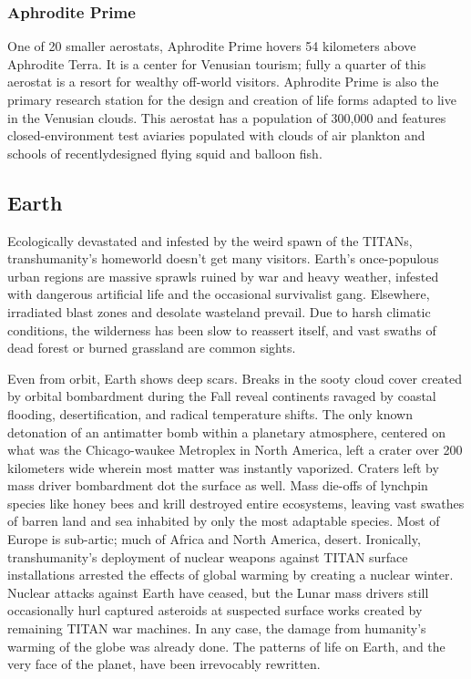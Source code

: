 \subsubsection{Aphrodite Prime}
\label{sec:aphrodite-prime}

One of 20 smaller aerostats, Aphrodite Prime hovers 54 kilometers
above Aphrodite Terra. It is a center for Venusian tourism; fully a
quarter of this aerostat is a resort for wealthy off-world
visitors. Aphrodite Prime is also the primary research station for the
design and creation of life forms adapted to live in the Venusian
clouds. This aerostat has a population of 300,000 and features
closed-environment test aviaries populated with clouds of air plankton
and schools of recentlydesigned flying squid and balloon fish.

\subsection{Earth}
\label{sec:earth}

Ecologically devastated and infested by the weird spawn of the TITANs,
transhumanity's homeworld doesn't get many visitors. Earth's
once-populous urban regions are massive sprawls ruined by war and
heavy weather, infested with dangerous artificial life and the
occasional survivalist gang. Elsewhere, irradiated blast zones and
desolate wasteland prevail. Due to harsh climatic conditions, the
wilderness has been slow to reassert itself, and vast swaths of dead
forest or burned grassland are common sights.

Even from orbit, Earth shows deep scars. Breaks in the sooty cloud
cover created by orbital bombardment during the Fall reveal continents
ravaged by coastal flooding, desertification, and radical temperature
shifts. The only known detonation of an antimatter bomb within a
planetary atmosphere, centered on what was the Chicago-waukee
Metroplex in North America, left a crater over 200 kilometers wide
wherein most matter was instantly vaporized. Craters left by mass
driver bombardment dot the surface as well. Mass die-offs of lynchpin
species like honey bees and krill destroyed entire ecosystems, leaving
vast swathes of barren land and sea inhabited by only the most
adaptable species. Most of Europe is sub-artic; much of Africa and
North America, desert. Ironically, transhumanity's deployment of
nuclear weapons against TITAN surface installations arrested the
effects of global warming by creating a nuclear winter. Nuclear
attacks against Earth have ceased, but the Lunar mass drivers still
occasionally hurl captured asteroids at suspected surface works
created by remaining TITAN war machines. In any case, the damage from
humanity's warming of the globe was already done. The patterns of life
on Earth, and the very face of the planet, have been irrevocably
rewritten.

